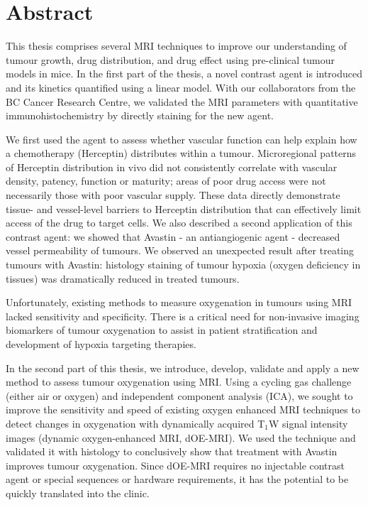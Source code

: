 
\chapter{Abstract}

This thesis comprises several MRI techniques to improve our understanding of tumour growth, drug distribution, and drug effect using pre-clinical tumour models in mice. In the first part of the thesis, a novel contrast agent is introduced and its kinetics quantified using a linear model. With our collaborators from the BC Cancer Research Centre, we validated the MRI parameters with quantitative immunohistochemistry by directly staining for the new agent.

We first used the agent to assess whether vascular function can help explain how a chemotherapy (Herceptin) distributes within a tumour. Microregional patterns of Herceptin distribution in vivo did not consistently correlate with vascular density, patency, function or maturity; areas of poor drug access were not necessarily those with poor vascular supply. These data directly demonstrate tissue- and vessel-level barriers to Herceptin distribution that can effectively limit access of the drug to target cells. We also described a second application of this contrast agent: we showed that Avastin - an antiangiogenic agent - decreased vessel permeability of tumours. We observed an unexpected result after treating tumours with Avastin: histology staining of tumour hypoxia (oxygen deficiency in tissues) was dramatically reduced in treated tumours. 

Unfortunately, existing methods to measure oxygenation in tumours using MRI lacked sensitivity and specificity. There is a critical need for non-invasive imaging biomarkers of tumour oxygenation to assist in patient stratification and development of hypoxia targeting therapies.

In the second part of this thesis, we introduce, develop, validate and apply a new method to assess tumour oxygenation using MRI. Using a cycling gas challenge (either air or oxygen) and independent component analysis (\acs{ICA}), we sought to improve the sensitivity and speed of existing oxygen enhanced MRI techniques to detect changes in oxygenation with dynamically acquired T$_1$W signal intensity images (dynamic oxygen-enhanced MRI, \acs{dOE-MRI}). We used the technique and validated it with histology to conclusively show that treatment with Avastin improves tumour oxygenation. Since \acs{dOE-MRI} requires no injectable contrast agent or special sequences or hardware requirements, it has the potential to be quickly translated into the clinic.

